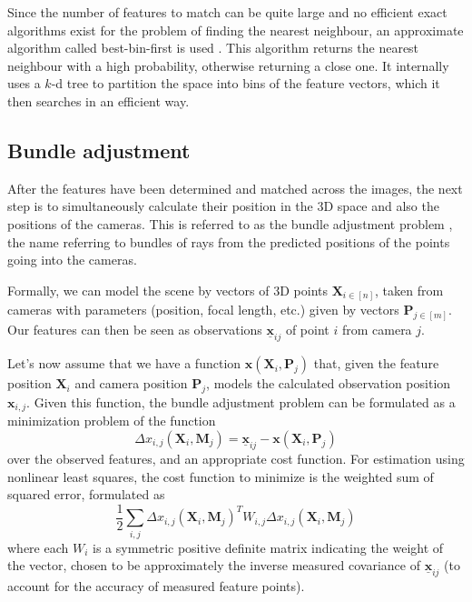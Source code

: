 Since the number of features to match can be quite large and no efficient exact algorithms exist for the problem of finding the nearest neighbour, an approximate algorithm called best-bin-first is used \cite{beis1997shape}.
This algorithm returns the nearest neighbour with a high probability, otherwise returning a close one.
It internally uses a $k$-d tree to partition the space into bins of the feature vectors, which it then searches in an efficient way.

\subsection{Bundle adjustment}
After the features have been determined and matched across the images, the next step is to simultaneously calculate their position in the 3D space and also the positions of the cameras.
This is referred to as the bundle adjustment problem \cite{snavely2008modeling,schneider19913}, the name referring to bundles of rays from the predicted positions of the points going into the cameras.

Formally, we can model the scene by vectors of 3D points $\mathbf{X}_{i \in [n]}$, taken from cameras with parameters (position, focal length, etc.) given by vectors $\mathbf{P}_{j \in [m]}$.
Our features can then be seen as observations $\underline{\bm{x}}_{ij}$ of point $i$ from camera $j$.

Let's now assume that we have a function $\bm{x}(\mathbf{X}_i, \mathbf{P}_j)$ that, given the feature position $\mathbf{X}_i$ and camera position $\mathbf{P}_j$, models the calculated observation position $\mathbf{x}_{i, j}$.
Given this function, the bundle adjustment problem can be formulated as a minimization problem of the function \begin{equation} \Delta x_{i, j} (\mathbf{X}_i, \mathbf{M}_j) = \underline{\bm{x}}_{ij} - \bm{x}(\mathbf{X}_i, \mathbf{P}_j) \end{equation}
over the observed features, and an appropriate cost function. For estimation using nonlinear least squares, the cost function to minimize is the weighted sum of squared error, formulated as 
\begin{equation} \frac{1}{2} \sum_{i,j} \Delta x_{i, j} (\mathbf{X}_i, \mathbf{M}_j)^T W_{i,j} \Delta x_{i, j} (\mathbf{X}_i, \mathbf{M}_j) \end{equation}
where each $W_i$ is a symmetric positive definite matrix indicating the weight of the vector, chosen to be approximately the inverse measured covariance of $\underline{\bm{x}}_{ij}$ (to account for the accuracy of measured feature points).

